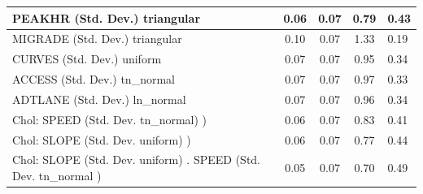 \begin{table}
\begin{center}
\begin{tabular}{|l|l|c|c|c|l|}
			\hline
			PEAKHR (Std. Dev.) triangular &  & 0.06 & 0.07 & 0.79 & 0.43 \\
			\hline
			MIGRADE (Std. Dev.) triangular &  & 0.10 & 0.07 & 1.33 & 0.19 \\
			\hline
			CURVES (Std. Dev.) uniform &  & 0.07 & 0.07 & 0.95 & 0.34 \\
			\hline
			ACCESS (Std. Dev.) tn_normal &  & 0.07 & 0.07 & 0.97 & 0.33 \\
			\hline
			ADTLANE (Std. Dev.) ln_normal &  & 0.07 & 0.07 & 0.96 & 0.34 \\
			\hline
			 Chol: SPEED (Std. Dev. tn_normal) ) &  & 0.06 & 0.07 & 0.83 & 0.41 \\
			\hline
			 Chol: SLOPE (Std. Dev. uniform) ) &  & 0.06 & 0.07 & 0.77 & 0.44 \\
			\hline
			 Chol: SLOPE (Std. Dev. uniform) . SPEED (Std. Dev.   tn_normal ) &  & 0.05 & 0.07 & 0.70 & 0.49 \\
			\hline
		\end{tabular}
	\end{center}
\end{table}